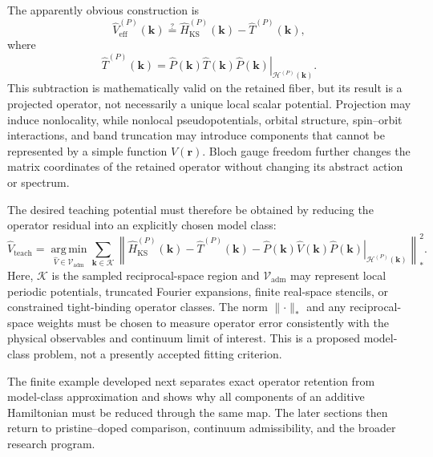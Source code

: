 The apparently obvious construction is
\begin{equation}
    \hat V_{\mathrm{eff}}^{(P)}(\mathbf k)
    \stackrel{?}{=}
    \hat H_{\mathrm{KS}}^{(P)}(\mathbf k)
    -
    \hat T^{(P)}(\mathbf k),
\end{equation}
where
\begin{equation}
    \hat T^{(P)}(\mathbf k)
    =
    \left.
        \hat P(\mathbf k)
        \hat T(\mathbf k)
        \hat P(\mathbf k)
    \right|_{\mathcal H^{(P)}(\mathbf k)}.
\end{equation}
This subtraction is mathematically valid on the retained fiber, but its result
is a projected operator, not necessarily a unique local scalar potential.
Projection may induce nonlocality, while nonlocal pseudopotentials, orbital
structure, spin--orbit interactions, and band truncation may introduce
components that cannot be represented by a simple function $V(\mathbf r)$.
Bloch gauge freedom further changes the matrix coordinates of the retained
operator without changing its abstract action or spectrum.

The desired teaching potential must therefore be obtained by reducing the
operator residual into an explicitly chosen model class:
\begin{equation}
    \hat V_{\mathrm{teach}}
    =
    \operatorname*{arg\,min}_{\hat V\in\mathcal V_{\mathrm{adm}}}
    \sum_{\mathbf k\in\mathcal K}
    \left\|
        \hat H_{\mathrm{KS}}^{(P)}(\mathbf k)
        -
        \hat T^{(P)}(\mathbf k)
        -
        \left.
            \hat P(\mathbf k)
            \hat V(\mathbf k)
            \hat P(\mathbf k)
        \right|_{\mathcal H^{(P)}(\mathbf k)}
    \right\|_*^2.
\end{equation}
Here, $\mathcal K$ is the sampled reciprocal-space region and
$\mathcal V_{\mathrm{adm}}$ may represent local periodic potentials, truncated
Fourier expansions, finite real-space stencils, or constrained tight-binding
operator classes. The norm $\lVert\cdot\rVert_*$ and any reciprocal-space
weights must be chosen to measure operator error consistently with the physical
observables and continuum limit of interest. This is a proposed model-class
problem, not a presently accepted fitting criterion.

The finite example developed next separates exact operator retention from
model-class approximation and shows why all components of an additive
Hamiltonian must be reduced through the same map. The later sections then
return to pristine--doped comparison, continuum admissibility, and the broader
research program.

